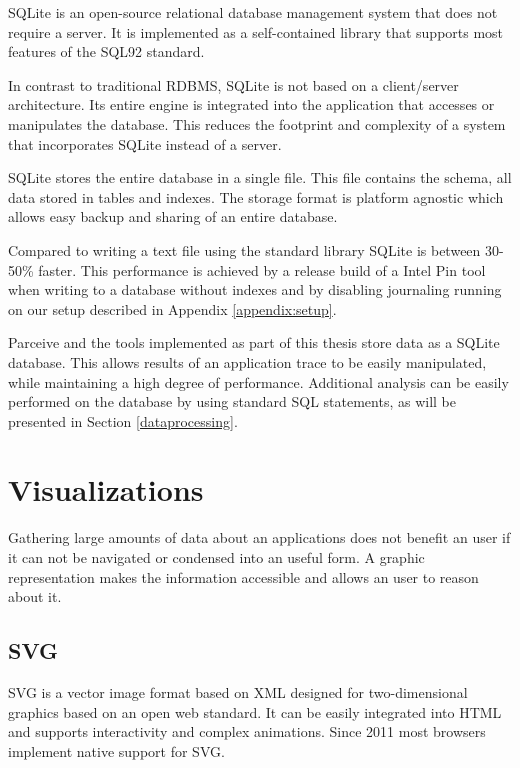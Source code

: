 SQLite \cite{sqlitebook} is an open-source relational database management system that does not require a server. It is implemented as a self-contained library that supports most features of the SQL92 standard.

In contrast to traditional RDBMS, SQLite is not based on a client/server architecture. Its entire engine is integrated into the application that accesses or manipulates the database. This reduces the footprint and complexity of a system that incorporates SQLite instead of a server.

SQLite stores the entire database in a single file. This file contains the schema, all data stored in tables and indexes. The storage format is platform agnostic which allows easy backup and sharing of an entire database.

Compared to writing a text file using the standard library SQLite is between 30-50\% faster. This performance is achieved by a release build of a Intel Pin tool when writing to a database without indexes and by disabling journaling running on our setup described in Appendix \ref{appendix:setup}.

Parceive and the tools implemented as part of this thesis store data as a SQLite database. This allows results of an application trace to be easily manipulated, while maintaining a high degree of performance. Additional analysis can be easily performed on the database by using standard SQL statements, as will be presented in Section \ref{dataprocessing}.

\section {Visualizations}

Gathering large amounts of data about an applications does not benefit an user if it can not be navigated or condensed into an useful form. A graphic representation makes the information accessible and allows an user to reason about it.

\subsection {SVG}

SVG \cite{svg11} is a vector image format based on XML designed for two-dimensional graphics based on an open web standard. It can be easily integrated into HTML and supports interactivity and complex animations. Since 2011 most browsers implement native support for SVG.

